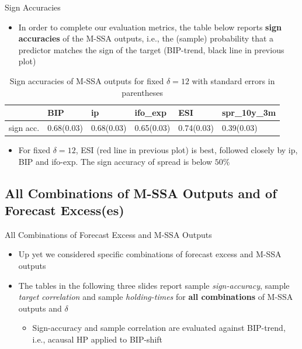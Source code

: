 \documentclass{beamer}
\begin{document}
\begin{frame} {Sign Accuracies}\label{signaac1}
\begin{itemize}
\item In order to complete our evaluation metrics, the table below reports \textbf{sign accuracies} of the M-SSA outputs, i.e., the (sample) probability that a predictor matches the sign of the target (BIP-trend, black line in previous plot)
\end{itemize}


\begin{table}[ht]
\centering
\begin{tabular}{rlllll}
  \hline
 & BIP & ip & ifo\_exp & ESI & spr\_10y\_3m \\ 
  \hline
sign acc. & 0.68(0.03) & 0.68(0.03) & 0.65(0.03) & 0.74(0.03) & 0.39(0.03) \\ 
   \hline
\end{tabular}
\caption{Sign accuracies of M-SSA outputs for fixed $\delta=12$ with standard errors in parentheses} 
\label{perf_var1}
\end{table}\begin{itemize}
\item For fixed $\delta=12$,  ESI (red line in previous plot) is best, followed closely by ip, BIP and ifo-exp. The sign accuracy of spread is below $50\%$ 
\end{itemize}

\end{frame}


\subsection{All Combinations  of M-SSA Outputs and of Forecast Excess(es)}



\begin{frame} {All Combinations of Forecast Excess and M-SSA Outputs}
\begin{itemize}
\item Up yet we considered specific combinations of forecast excess and M-SSA outputs
\item The tables in the following three slides report sample \emph{sign-accuracy}, sample \emph{target correlation}  and sample \emph{holding-times} for \textbf{all combinations} of M-SSA outputs and $\delta$
\begin{itemize}
\item Sign-accuracy and sample correlation are evaluated against BIP-trend, i.e., acausal HP applied to BIP-shift
\end{itemize}
\end{itemize}
\end{frame}
\end{document}
